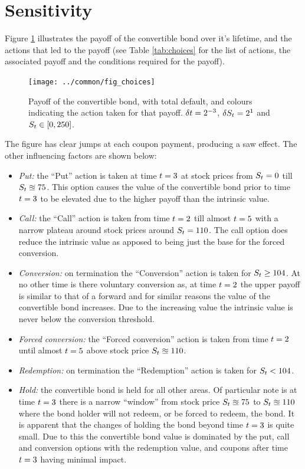 \documentclass[a4paper,11pt,oneside]{report}
\theoremstyle{plain}
\theoremstyle{definition}
\begin{document}

\section{Sensitivity}
Figure \ref{fig:choices} illustrates the payoff of the convertible bond over it's lifetime, and the actions that led to the payoff (see Table \ref{tab:choices} for the list of actions, the associated payoff and the conditions required for the payoff).

\begin{figure}[htb!]
 \centering
 \texttt{[image: ../common/fig\_choices]}
 \caption[Payoff]{Payoff of the convertible bond, with total default, and colours indicating the action taken for that payoff.  $\Dt = 2^{-3}$, $\DS = 2^{1}$ and $\S \in [0, 250]$.}
 \label{fig:choices}
\end{figure}

The figure has clear jumps at each coupon payment, producing a saw effect.  The other influencing factors are shown below:
\begin{itemize}
 \item \emph{Put:} the ``Put'' action is taken at time $\t = 3$ at stock prices from $\S = 0$ till $\S \approxeq 75$.  This option causes the value of the convertible bond prior to time $\t = 3$ to be elevated due to the higher payoff than the intrinsic value.
 \item \emph{Call:} the ``Call'' action is taken from time $\t = 2$ till almost $\t = 5$ with a narrow plateau around stock prices around $\S = 110$.  The call option does reduce the intrinsic value as apposed to being just the base for the forced conversion.
 \item \emph{Conversion:} on termination the ``Conversion'' action is taken for $\S \ge 104$.  At no other time is there voluntary conversion as, at time $\t = 2$ the upper payoff is similar to that of a forward and for similar reasons the value of the convertible bond increases.  Due to the increasing value the intrinsic value is never below the conversion threshold.
 \item \emph{Forced conversion:} the ``Forced conversion'' action is taken from time $\t = 2$ until almost $\t = 5$ above stock price $\S \approxeq 110$.
 \item \emph{Redemption:} on termination the ``Redemption'' action is taken for $\S < 104$.
 \item \emph{Hold:} the convertible bond is held for all other areas.  Of particular note is at time $\t = 3$ there is a narrow ``window'' from stock price $\S \approxeq 75$ to $\S \approxeq 110$ where the bond holder will not redeem, or be forced to redeem, the bond.  It is apparent that the changes of holding the bond beyond time $\t = 3$ is quite small.  Due to this the convertible bond value is dominated by the put, call and conversion options with the redemption value, and coupons after time $\t = 3$ having minimal impact.
\end{itemize}
\end{document}
